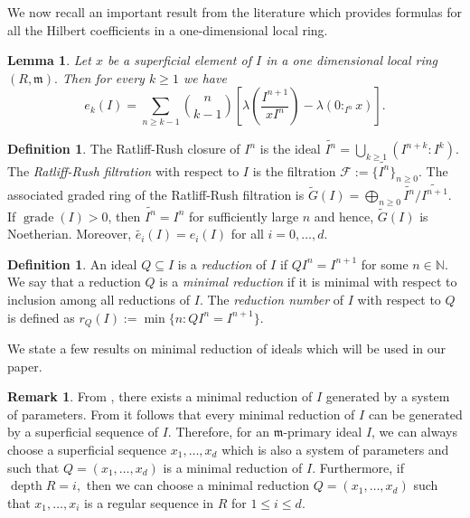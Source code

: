 \documentclass[reqno,a4paper,dvipsnames]{amsart}
\newcommand{\m}{\mathfrak{m} }
\newcommand{\grade}{\operatorname{grade}}
\newcommand{\depth}{\operatorname{depth}}
\newtheorem{lemma}[theorem]{Lemma}
\theoremstyle{definition}
\newtheorem{remark}[theorem]{Remark}
\newtheorem{definition}[theorem]{Definition}
\begin{document}
We now recall an important result from the literature which provides formulas for all the Hilbert coefficients in a one-dimensional local ring.

\begin{lemma} \cite[Lemma 2.1, 2.2]{rv} \label{formulahilbcoeffindimone} Let $x$ be a superficial element of $I$ in a one dimensional local ring $(R,\m).$ Then for every $k \geq 1$ we have 
\begin{equation*}
    e_{k}(I)=\sum_{n \geq k-1}
    \binom{n}{k-1}\left[\lambda\left(\frac{I^{n+1}}{xI^{n}}\right)-\lambda(0:_{I^{n}}x)\right].
\end{equation*} 
\end{lemma}


\begin{definition} \label{ratliffrushdef}
    The  Ratliff-Rush closure of $I^n$ is the ideal 
$\widetilde{I^n}=\displaystyle \bigcup_{k \geq 1}(I^{n+k}:I^{k})$. 
 The \textit{Ratliff-Rush filtration} with respect to $I$ is the filtration
 $\mathcal{F}:=\{\widetilde{I^{n}}\}_{n \geq 0}.$ 
The associated graded ring of the Ratliff-Rush filtration is  $\widetilde{G}(I)=\displaystyle \bigoplus_{n \geq 0}\widetilde{I^{n}}/\widetilde{I^{n+1}}$. 
  If $\grade(I)>0$, then  $\widetilde{I^{n}}=I^{n}$ for sufficiently large $n$ and  hence,  
  $\widetilde{G}(I)$ is Noetherian. Moreover,  $\widetilde{e_{i}}(I) = e_i(I)$ for all $i=0, \ldots, d$.
  \end{definition}


\begin{definition} \label{reductiondef}
     An ideal $Q \subseteq I$ is a \textit{reduction} of $I$ if $QI^{n}=I^{n+1}$ for some $n \in \mathbb{N}$. We say that a reduction $Q$  
is a \textit{minimal reduction} if it is minimal with respect to inclusion among all reductions of $I$. The \textit{reduction number} of $I$ with respect to $Q$ is defined  as 
   $r_{Q}(I):=\min\{n: QI^{n}=I^{n+1}\}. $
\end{definition}

We state a few results on minimal reduction of ideals which will be used in our paper. 

\begin{remark} \label{remarksup} 
 From \cite[Theorem 14.14]{matsumura}, there exists a minimal reduction of $I$ generated by a system of parameters.  From   \cite[Lemma 1.2]{rtt} it follows that  every minimal reduction of $I$ can be generated by a superficial sequence of $I$.   Therefore, for an $\m$-primary ideal
$I$,  we can always choose   a superficial sequence $x_{1},\ldots,x_{d}$ which is also a system of parameters and such that  $Q = (x_{1},\ldots,x_{d})$ is a minimal reduction of $I$. Furthermore, if $\depth R = i,$  then we can choose a minimal reduction $Q=(x_1, \ldots, x_d)$ such that $x_{1},\ldots,x_{i}$ is a regular sequence in $R$ for $1\leq i \leq d$.
\end{remark}
\end{document}
